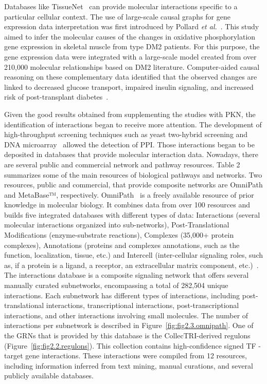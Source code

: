 Databases like TissueNet~\cite{RN137} can provide molecular interactions specific to a particular cellular context. The use of large-scale causal graphs for gene expression data interpretation was first introduced by Pollard \textit{et al.}~\cite{RN131, RN135}. This study aimed to infer the molecular causes of the changes in oxidative phosphorylation gene expression in skeletal muscle from type \gls{DM2} patients. For this purpose, the gene expression data were integrated with a large-scale model created from over 210,000 molecular relationships based on \gls{DM2} literature. 
Computer-aided causal reasoning on these complementary data identified that the observed changes are linked to decreased glucose transport, impaired insulin signaling, and increased risk of post-transplant diabetes~\cite{RN131}.


Given the good results obtained from supplementing the studies with PKN, the identification of interactions began to receive more attention. 
The development of high-throughput screening techniques such as yeast two-hybrid screening and DNA microarray~\cite{RN138} allowed the detection of PPI. 
Those interactions began to be deposited in databases that provide molecular interaction data. 
Nowadays, there are several public and commercial network and pathway resources. Table 2 summarizes some of the main resources of biological pathways and networks. 
Two resources, public and commercial, that provide composite networks are OmniPath and MetaBase™, respectively. OmniPath~\cite{RN91} is a freely available resource of prior knowledge in molecular biology. 
It combines data from over 100 resources and builds five integrated databases with different types of data: Interactions (several molecular interactions organized into sub-networks), Post-Translational Modifications (enzyme-substrate reactions), Complexes (35,000+ protein complexes), Annotations (proteins and complexes annotations, such as the function, localization, tissue, etc.) and Intercell (inter-cellular signaling roles, such as, if a protein is a ligand, a receptor, an extracellular matrix component,  etc.)~\cite{RN91}. 
The interactions database is a composite signaling network that offers several manually curated subnetworks, encompassing a total of 282,504 unique interactions. 
Each subnetwork has different types of interactions, including post-translational interactions, transcriptional interactions, post-transcriptional interactions, and other interactions involving small molecules. 
The number of interactions per subnetwork is described in Figure~\ref{fig:fig2.3.omnipath}. One of the GRNs that is provided by this database is the CollecTRI-derived regulons~\cite{RN145} (Figure~\ref{fig:fig2.2.regulons}). 
This collection contains high-confidence signed \gls{TF} - target gene interactions. 
These interactions were compiled from 12 resources, including information inferred from text mining, manual curations, and several publicly available databases.

